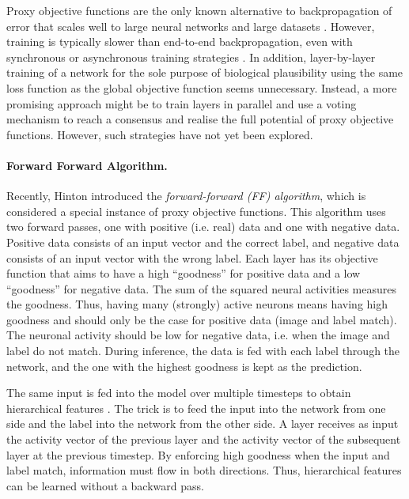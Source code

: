 Proxy objective functions are the only known alternative to backpropagation of error that scales well to large neural networks and large datasets .
However, training is typically slower than end-to-end backpropagation, even with synchronous or asynchronous training strategies  \cite{belilovsky_decoupled_2020}.
In addition, layer-by-layer training of a network for the sole purpose of biological plausibility using the same loss function as the global objective function seems unnecessary. Instead, a more promising approach might be to train layers in parallel and use a voting mechanism to reach a consensus and realise the full potential of proxy objective functions. However, such strategies have not yet been explored.

\paragraph{Forward Forward Algorithm.}
Recently, Hinton  introduced the \emph{forward-forward (FF) algorithm}, which is considered a special instance of proxy objective functions.
This algorithm uses two forward passes, one with positive (i.e. real) data and one with negative data.
Positive data consists of an input vector and the correct label, and negative data consists of an input vector with the wrong label.
Each layer has its objective function that aims to have a high ``goodness'' for positive data and a low ``goodness'' for negative data. 
The sum of the squared neural activities measures the goodness. Thus, having many (strongly) active neurons means having high goodness and should only be the case for positive data (image and label match). The neuronal activity should be low for negative data, i.e. when the image and label do not match.
During inference, the data is fed with each label through the network, and the one with the highest goodness is kept as the prediction.

The same input is fed into the model over multiple timesteps to obtain hierarchical features .
The trick is to feed the input into the network from one side and the label into the network from the other side. A layer receives as input the activity vector of the previous layer and the activity vector of the subsequent layer at the previous timestep. By enforcing high goodness when the input and label match, information must flow in both directions. Thus, hierarchical features can be learned without a backward pass.

